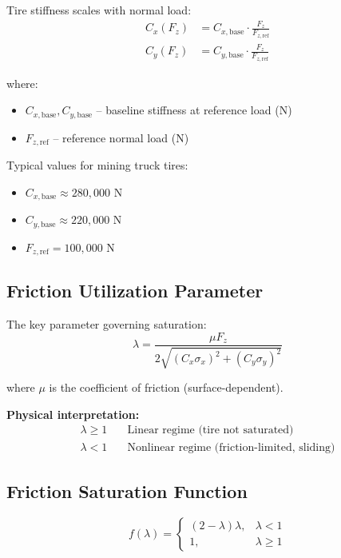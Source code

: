 \documentclass[11pt,a4paper]{article}
\begin{document}
Tire stiffness scales with normal load:
\begin{align}
C_x(F_z) &= C_{x,\text{base}} \cdot \frac{F_z}{F_{z,\text{ref}}} \\
C_y(F_z) &= C_{y,\text{base}} \cdot \frac{F_z}{F_{z,\text{ref}}}
\end{align}

where:
\begin{itemize}
    \item $C_{x,\text{base}}, C_{y,\text{base}}$ -- baseline stiffness at reference load (N)
    \item $F_{z,\text{ref}}$ -- reference normal load (N)
\end{itemize}

Typical values for mining truck tires:
\begin{itemize}
    \item $C_{x,\text{base}} \approx 280{,}000$ N
    \item $C_{y,\text{base}} \approx 220{,}000$ N
    \item $F_{z,\text{ref}} = 100{,}000$ N
\end{itemize}

\subsection{Friction Utilization Parameter}

The key parameter governing saturation:
\begin{equation}
\boxed{\lambda = \frac{\mu F_z}{2\sqrt{(C_x \sigma_x)^2 + (C_y \sigma_y)^2}}}
\label{eq:lambda}
\end{equation}

where $\mu$ is the coefficient of friction (surface-dependent).

\textbf{Physical interpretation:}
\begin{align}
\lambda \geq 1 &\quad \text{Linear regime (tire not saturated)} \\
\lambda < 1 &\quad \text{Nonlinear regime (friction-limited, sliding)}
\end{align}

\subsection{Friction Saturation Function}

\begin{equation}
\boxed{f(\lambda) = \begin{cases}
(2 - \lambda)\lambda, & \lambda < 1 \\
1, & \lambda \geq 1
\end{cases}}
\label{eq:saturation}
\end{equation}
\end{document}

